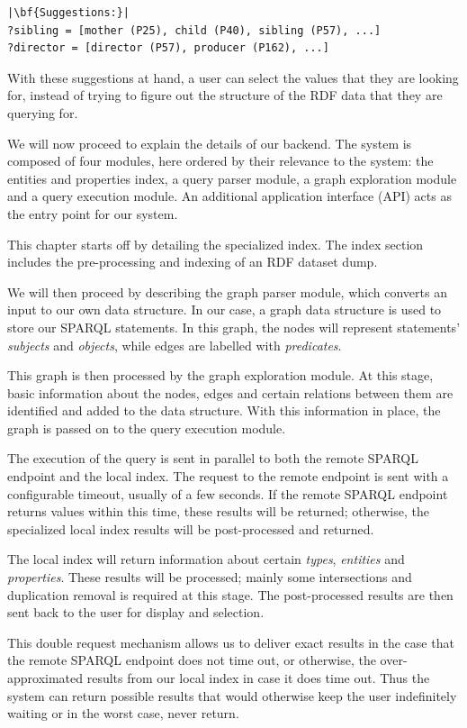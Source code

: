 \begin{verbatim}
|\bf{Suggestions:}|
?sibling = [mother (P25), child (P40), sibling (P57), ...]
?director = [director (P57), producer (P162), ...]
\end{verbatim}

With these suggestions at hand, a user can select the values that they are looking for, instead of trying to figure out the structure of the RDF data that they are querying for.

We will now proceed to explain the details of our backend. The system is composed of four modules, here ordered by their relevance to the system: 
the entities and properties index,
a query parser module,
a graph exploration module and
a query execution module. 
An additional application interface (API) acts as the entry point for our system.

This chapter starts off by detailing the specialized index.
The index section includes the pre-processing and indexing of an RDF dataset dump.

We will then proceed by describing the graph parser module, which converts an input to our own data structure. 
In our case, a graph data structure is used to store our SPARQL statements. 
In this graph, the nodes will represent statements' \textit{subjects} and \textit{objects}, while edges are labelled with \textit{predicates}. 

This graph is then processed by the graph exploration module. 
At this stage, basic information about the nodes, edges and certain relations between them are identified and added to the data structure. 
With this information in place, the graph is passed on to the query execution module. 

The execution of the query is sent in parallel to both the remote SPARQL endpoint and the local index. 
The request to the remote endpoint is sent with a configurable timeout, usually of a few seconds. 
If the remote SPARQL endpoint returns values within this time, these results will be returned; otherwise, the specialized local index results will be post-processed and returned. 

The local index will return information about certain \textit{types}, \textit{entities} and \textit{properties}. 
These results will be processed; mainly some intersections and duplication removal is required at this stage.
The post-processed results are then sent back to the user for display and selection.

This double request mechanism allows us to deliver exact results in the case that the remote SPARQL endpoint does not time out, or otherwise, the over-approximated results from our local index in case it does time out. 
Thus the system can return possible results that would otherwise keep the user indefinitely waiting or in the worst case, never return. 

